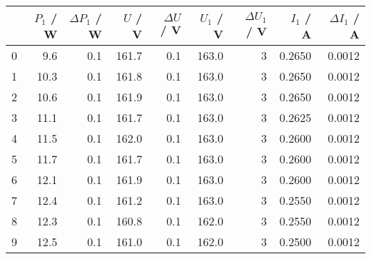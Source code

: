 \begin{tabular}{lrrrrrrrr}
	\toprule
	{} & $P_1$ / \si{\watt} & $\Delta P_1$ / \si{\watt} & $U$ / \si{\volt} & $\Delta U$ / \si{\volt} & $U_1$ / \si{\volt} & $\Delta U_1$ / \si{\volt} & $I_1$ / \si{\ampere} & $\Delta I_1$ / \si{\ampere} \\
	\midrule
	0  & 9.6                & 0.1                       & 161.7            & 0.1                     & 163.0              & 3                         & 0.2650               & 0.0012                      \\
	1  & 10.3               & 0.1                       & 161.8            & 0.1                     & 163.0              & 3                         & 0.2650               & 0.0012                      \\
	2  & 10.6               & 0.1                       & 161.9            & 0.1                     & 163.0              & 3                         & 0.2650               & 0.0012                      \\
	3  & 11.1               & 0.1                       & 161.7            & 0.1                     & 163.0              & 3                         & 0.2625               & 0.0012                      \\
	4  & 11.5               & 0.1                       & 162.0            & 0.1                     & 163.0              & 3                         & 0.2600               & 0.0012                      \\
	5  & 11.7               & 0.1                       & 161.7            & 0.1                     & 163.0              & 3                         & 0.2600               & 0.0012                      \\
	6  & 12.1               & 0.1                       & 161.9            & 0.1                     & 163.0              & 3                         & 0.2600               & 0.0012                      \\
	7  & 12.4               & 0.1                       & 161.2            & 0.1                     & 163.0              & 3                         & 0.2550               & 0.0012                      \\
	8  & 12.3               & 0.1                       & 160.8            & 0.1                     & 162.0              & 3                         & 0.2550               & 0.0012                      \\
	9  & 12.5               & 0.1                       & 161.0            & 0.1                     & 162.0              & 3                         & 0.2500               & 0.0012                      \\

\end{tabular}
